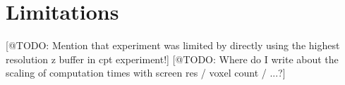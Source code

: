 










\section{Limitations}




[@TODO: Mention that experiment was limited by directly using the highest resolution z buffer in cpt experiment!]
[@TODO: Where do I write about the scaling of computation times with screen res / voxel count / ...?]




%
%
%
